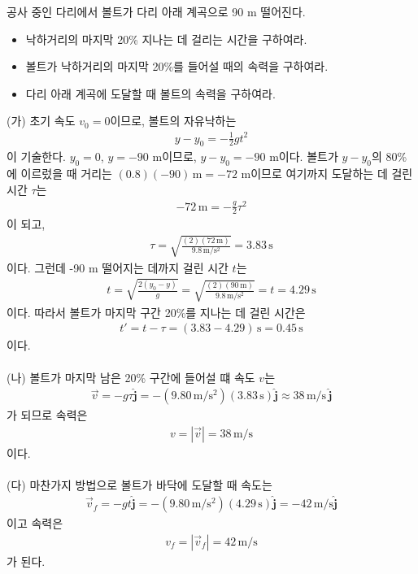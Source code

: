 \documentclass[APS,floatfix,nofootinbib,superscriptaddress,fleqn,preprint]{revtex4}
\begin{document}
공사 중인 다리에서 볼트가 다리 아래 계곡으로 90 m 떨어진다.
\begin{itemize}
\item[(가)] 낙하거리의 마지막 20\% 지나는 데 걸리는 시간을 구하여라.
\item[(나)] 볼트가 낙하거리의 마지막 20\%를 들어설 때의 속력을
  구하여라.
\item[(다)] 다리 아래 계곡에 도달할 때 볼트의 속력을 구하여라.   
\end{itemize} 
(가) 초기 속도 $v_0=0$이므로, 볼트의 자유낙하는
\begin{align*}
y-y_0= -\frac12 gt^2  
\end{align*}
이 기술한다. $y_0=0$, $y=-90$ m이므로, $y-y_0=-90$ m이다. 볼트가
$y-y_0$의 80\%에 이르렀을 때 거리는 $(0.8)(-90)\, \mathrm{m}= -72$
m이므로  여기까지 도달하는 데 걸린 시간 $\tau$는 
\begin{align*}
-72\,\mathrm{m} = -\frac{g}{2} \tau^2  
\end{align*}
이 되고,
\begin{align*}
\tau = \sqrt{\frac{(2) (72\,\mathrm{m})}{9.8\,\mathrm{m/s^2}}} =
  3.83\,\mathrm{s} 
\end{align*}
이다. 그런데 -90 m 떨어지는 데까지 걸린 시간 $t$는
\begin{align*}
t = \sqrt{\frac{2(y_0-y)}{g}} = \sqrt{\frac{(2) (90\,\mathrm
  m)}{9.8\,\mathrm{m/s^2}}} = t = 4.29\,\mathrm{s}  
\end{align*}
이다. 따라서 볼트가 마지막 구간 20\%를 지나는 데 걸린 시간은
\begin{align*}
t' = t-\tau = (3.83-4.29)\,\mathrm{s} = 0.45\,\mathrm{s} 
\end{align*}
이다.
\\
\\
\noindent (나) 볼트가 마지막 남은 20\% 구간에 들어설 떄 속도 $v$는
\begin{align*}
\vec{v} = -g\tau\hat{\bm{j}} =
  -(9.80\,\mathrm{m/s^2})(3.83\,\mathrm{s})\hat{\bm{j}} \approx 
  38\,\mathrm{m/s}   \,\hat{\bm{j}}  
\end{align*}
가 되므로 속력은
\begin{align*}
  v = |\vec{v}| = 38\,\mathrm{m/s} 
\end{align*}
이다. 
\\
\\
\noindent (다)
마찬가지 방법으로 볼트가 바닥에 도달할 때 속도는 
\begin{align*}
  \vec{v}_f = -gt \hat{\bm{j}}  =
  -(9.80\,\mathrm{m/s^2})(4.29\,\mathrm{s}) \hat{\bm{j}}
  =-42\,\mathrm{m/s} \hat{\bm{j}}
\end{align*}
이고 속력은
\begin{align*}
v_f = |\vec{v}_f| = 42\, \mathrm{m/s}  
\end{align*}
가 된다.   
\end{document}
